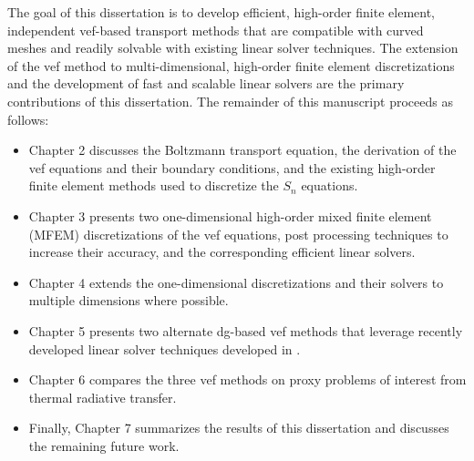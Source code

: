 \documentclass[../doc.tex]{subfiles}
\begin{document}
The goal of this dissertation is to develop efficient, high-order finite element, independent \gls{vef}-based transport methods that are compatible with curved meshes and readily solvable with existing linear solver techniques. The extension of the \gls{vef} method to multi-dimensional, high-order finite element discretizations and the development of fast and scalable linear solvers are the primary contributions of this dissertation. The remainder of this manuscript proceeds as follows: 
	\begin{itemize}
		\item Chapter 2 discusses the Boltzmann transport equation, the derivation of the \gls{vef} equations and their boundary conditions, and the existing high-order finite element methods used to discretize the $S_n$ equations. 
		\item Chapter 3 presents two one-dimensional high-order mixed finite element (MFEM) discretizations of the \gls{vef} equations, post processing techniques to increase their accuracy, and the corresponding efficient linear solvers. 
		\item Chapter 4 extends the one-dimensional discretizations and their solvers to multiple dimensions where possible.
		\item Chapter 5 presents two alternate \gls{dg}-based \gls{vef} methods that leverage recently developed linear solver techniques developed in \cite{pazner_usc}. 
		\item Chapter 6 compares the three \gls{vef} methods on proxy problems of interest from thermal radiative transfer.
		\item Finally, Chapter 7 summarizes the results of this dissertation and discusses the remaining future work. 
	\end{itemize}

\end{document}
